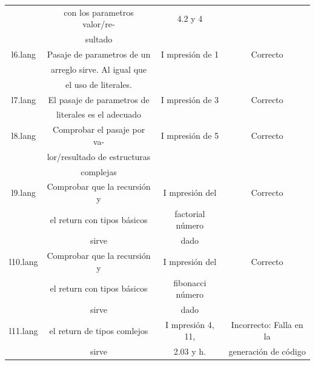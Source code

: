 \documentclass[11pt, spanish]{report}
\begin{document}
\begin{itemize}
\begin{table}[!hbp]
\begin{tabular}{c c c c}
                     & con los parametros valor/re-   & 4.2 y 4              &           \\ [1ex] 
                     & sultado                        &                      &           \\ [1ex] 
      l6.lang        & Pasaje de parametros de un     & I mpresi\'on de 1    & Correcto  \\ [1ex] 
                     & arreglo sirve. Al igual que    &                      &           \\ [1ex] 
                     & el uso de literales.           &                      &           \\ [1ex] 
      l7.lang        & El pasaje de parametros de     & I mpresi\'on de 3    & Correcto  \\ [1ex] 
                     & literales es el adecuado       &                      &           \\ [1ex] 
      l8.lang        & Comprobar el pasaje por va-    & I mpresi\'on de 5    & Correcto  \\ [1ex] 
                     & lor/resultado de estructuras   &                      &           \\ [1ex] 
                     & complejas                      &                      &           \\ [1ex] 
      l9.lang        & Comprobar que la recursión y   & I mpresi\'on del     & Correcto  \\ [1ex] 
                     & el return con tipos básicos    & factorial n\'umero   &           \\ [1ex] 
                     & sirve                          & dado                 &           \\ [1ex] 
      l10.lang       & Comprobar que la recursión y   & I mpresi\'on del     & Correcto  \\ [1ex] 
                     & el return con tipos básicos    & fibonacci n\'umero   &           \\ [1ex] 
                     & sirve                          & dado                 &           \\ [1ex] 
      l11.lang       & el return de tipos comlejos    & I mpresi\'on  4, 11, & Incorrecto: Falla en la  \\ [1ex] 
                     & sirve                          & 2.03 y h.            & generaci\'on de c\'odigo  \\ [1ex] 

      \hline
    \end{tabular}    
  \end{table}


\end{itemize}
\end{document}
